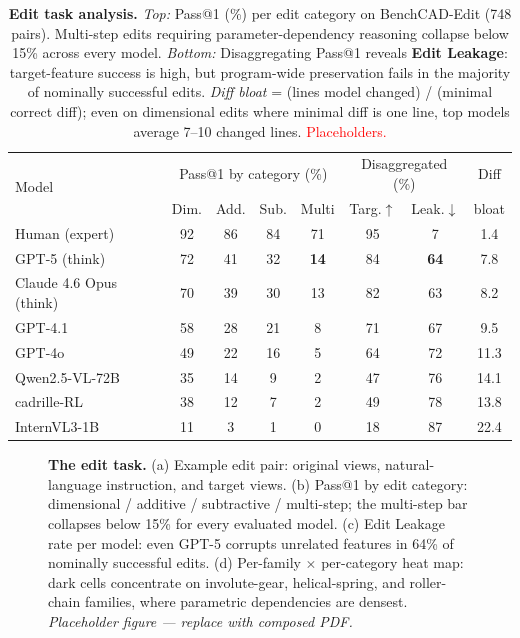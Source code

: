 \documentclass{article}
\begin{document}
\begin{table}[t]
\centering
\small
\setlength{\tabcolsep}{4pt}
\caption{\textbf{Edit task analysis.} \emph{Top:} Pass@1 (\%) per edit category on BenchCAD-Edit (748 pairs). Multi-step edits requiring parameter-dependency reasoning collapse below 15\% across every model. \emph{Bottom:} Disaggregating Pass@1 reveals \textbf{Edit Leakage}: target-feature success is high, but program-wide preservation fails in the majority of nominally successful edits. \emph{Diff bloat} = (lines model changed) / (minimal correct diff); even on dimensional edits where minimal diff is one line, top models average 7--10 changed lines. \textcolor{red}{Placeholders.}}
\label{tab:edit_leakage}
\begin{tabular}{lcccc|cc|c}
\toprule
\multirow{2}{*}{Model} & \multicolumn{4}{c|}{Pass@1 by category (\%)} & \multicolumn{2}{c|}{Disaggregated (\%)} & Diff \\
              & Dim. & Add. & Sub. & Multi & Targ.$\uparrow$ & Leak.$\downarrow$ & bloat \\
\midrule
Human (expert)              & 92 & 86 & 84 & 71 & 95 & 7  & 1.4 \\
GPT-5 (think)               & 72 & 41 & 32 & \textbf{14} & 84 & \textbf{64} & 7.8 \\
Claude 4.6 Opus (think)     & 70 & 39 & 30 & 13 & 82 & 63 & 8.2 \\
GPT-4.1                     & 58 & 28 & 21 & 8  & 71 & 67 & 9.5 \\
GPT-4o                      & 49 & 22 & 16 & 5  & 64 & 72 & 11.3 \\
Qwen2.5-VL-72B              & 35 & 14 & 9  & 2  & 47 & 76 & 14.1 \\
cadrille-RL                 & 38 & 12 & 7  & 2  & 49 & 78 & 13.8 \\
InternVL3-1B                & 11 & 3  & 1  & 0  & 18 & 87 & 22.4 \\
\bottomrule
\end{tabular}
\end{table}


\begin{figure}[t]
  \centering
  \fbox{\rule[-2cm]{0cm}{4cm} \rule[0cm]{14cm}{0cm}}
  \caption{\textbf{The edit task.} (a) Example edit pair: original views, natural-language instruction, and target views. (b) Pass@1 by edit category: dimensional / additive / subtractive / multi-step; the multi-step bar collapses below 15\% for every evaluated model. (c) Edit Leakage rate per model: even GPT-5 corrupts unrelated features in 64\% of nominally successful edits. (d) Per-family $\times$ per-category heat map: dark cells concentrate on involute-gear, helical-spring, and roller-chain families, where parametric dependencies are densest. \emph{Placeholder figure --- replace with composed PDF.}}
  \label{fig:edit}
\end{figure}
\end{document}
